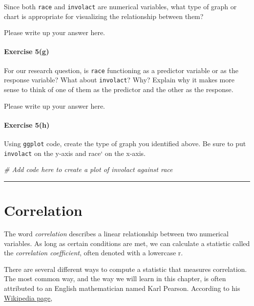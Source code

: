 \documentclass[
]{book}
\newenvironment{Shaded}{\begin{snugshade}}{\end{snugshade}}
\newcommand{\CommentTok}[1]{\textcolor[rgb]{0.56,0.35,0.01}{\textit{#1}}}
\begin{document}
Since both \texttt{race} and \texttt{involact} are numerical variables, what type of graph or chart is appropriate for visualizing the relationship between them?

Please write up your answer here.

\hypertarget{exercise-5g}{%
\paragraph*{Exercise 5(g)}\label{exercise-5g}}

For our research question, is \texttt{race} functioning as a predictor variable or as the response variable? What about \texttt{involact}? Why? Explain why it makes more sense to think of one of them as the predictor and the other as the response.

Please write up your answer here.

\hypertarget{exercise-5h}{%
\paragraph*{Exercise 5(h)}\label{exercise-5h}}

Using \texttt{ggplot} code, create the type of graph you identified above. Be sure to put \texttt{involact} on the y-axis and race` on the x-axis.

\begin{Shaded}
\begin{Highlighting}[]
\CommentTok{\# Add code here to create a plot of involact against race}
\end{Highlighting}
\end{Shaded}

\begin{center}\rule{0.5\linewidth}{0.5pt}\end{center}

\hypertarget{correlation-correlation}{%
\section{Correlation}\label{correlation-correlation}}

The word \emph{correlation} describes a linear relationship between two numerical variables. As long as certain conditions are met, we can calculate a statistic called the \emph{correlation coefficient}, often denoted with a lowercase r.

There are several different ways to compute a statistic that measures correlation. The most common way, and the way we will learn in this chapter, is often attributed to an English mathematician named Karl Pearson. According to his \href{https://en.wikipedia.org/wiki/Karl_Pearson}{Wikipedia page},
\end{document}
